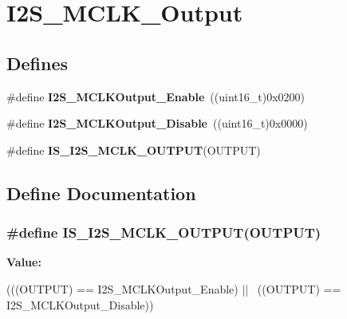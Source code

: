 \hypertarget{group__I2S__MCLK__Output}{
\section{I2S\_\-MCLK\_\-Output}
\label{group__I2S__MCLK__Output}
}
\subsection*{Defines}
\begin{DoxyCompactItemize}
\item 
\hypertarget{group__I2S__MCLK__Output_ga99713ee8c824f4d3bb25a9ce7bf5312a}{
\#define {\bfseries I2S\_\-MCLKOutput\_\-Enable}~((uint16\_\-t)0x0200)}
\label{group__I2S__MCLK__Output_ga99713ee8c824f4d3bb25a9ce7bf5312a}

\item 
\hypertarget{group__I2S__MCLK__Output_gaea09824d7e6359924152277ed3661e7e}{
\#define {\bfseries I2S\_\-MCLKOutput\_\-Disable}~((uint16\_\-t)0x0000)}
\label{group__I2S__MCLK__Output_gaea09824d7e6359924152277ed3661e7e}

\item 
\#define {\bfseries IS\_\-I2S\_\-MCLK\_\-OUTPUT}(OUTPUT)
\end{DoxyCompactItemize}


\subsection{Define Documentation}
\hypertarget{group__I2S__MCLK__Output_ga829ae526d1d11f14592e881f800fbb8a}{
\subsubsection[{IS\_\-I2S\_\-MCLK\_\-OUTPUT}]{\setlength{\rightskip}{0pt plus 5cm}\#define IS\_\-I2S\_\-MCLK\_\-OUTPUT(OUTPUT)}}
\label{group__I2S__MCLK__Output_ga829ae526d1d11f14592e881f800fbb8a}
{\bfseries Value:}
\begin{DoxyCode}
(((OUTPUT) == I2S_MCLKOutput_Enable) || \
                                    ((OUTPUT) == I2S_MCLKOutput_Disable))
\end{DoxyCode}
